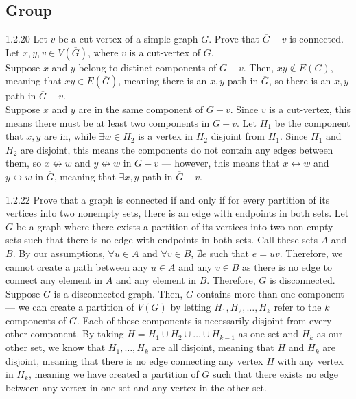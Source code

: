 \documentclass[9pt]{extarticle}
\begin{document}
\subsection*{Group}%
\begin{problem}{1.2.20}
  Let $v$ be a cut-vertex of a simple graph $G$. Prove that $\overline{G} - v$ is connected.
  \tcblower
  Let $x,y,v\in V(\overline{G})$, where $v$ is a cut-vertex of $G$.\\

  Suppose $x$ and $y$ belong to distinct components of $G-v$. Then, $xy\not\in E(G)$, meaning that $xy\in E(\overline{G})$, meaning there is an $x,y$ path in $\overline{G}$, so there is an $x,y$ path in $\overline{G}-v$.\\

  Suppose $x$ and $y$ are in the same component of $G-v$. Since $v$ is a cut-vertex, this means there must be at least two components in $G-v$. Let $H_1$ be the component that $x,y$ are in, while $\exists w\in H_2$ is a vertex in $H_2$ disjoint from $H_1$. Since $H_1$ and $H_2$ are disjoint, this means the components do not contain any edges between them, so $x\not\leftrightarrow w$ and $y\not\leftrightarrow w$ in $G-v$ --- however, this means that $x\leftrightarrow w$ and $y\leftrightarrow w$ in $\overline{G}$, meaning that $\exists x,y$ path in $\overline{G} - v$.
\end{problem}
\begin{problem}{1.2.22}
  Prove that a graph is connected if and only if for every partition of its vertices into two nonempty sets, there is an edge with endpoints in both sets. 
  \tcblower
  Let $G$ be a graph where there exists a partition of its vertices into two non-empty sets such that there is no edge with endpoints in both sets. Call these sets $A$ and $B$. By our assumptions, $\forall u\in A$ and $\forall v\in B$, $\nexists e$ such that $e = uv$. Therefore, we cannot create a path between any $u\in A$ and any $v\in B$ as there is no edge to connect any element in $A$ and any element in $B$. Therefore, $G$ is disconnected.\\

  Suppose $G$ is a disconnected graph. Then, $G$ contains more than one component --- we can create a partition of $V(G)$ by letting $H_1,H_2,\dots,H_k$ refer to the $k$ components of $G$. Each of these components is necessarily disjoint from every other component. By taking $H = H_1\cup H_2\cup\dots\cup H_{k-1}$ as one set and $H_k$ as our other set, we know that $H_1,\dots,H_k$ are all disjoint, meaning that $H$ and $H_k$ are disjoint, meaning that there is no edge connecting any vertex $H$ with any vertex in $H_k$, meaning we have created a partition of $G$ such that there exists no edge between any vertex in one set and any vertex in the other set.
\end{problem}
\end{document}

